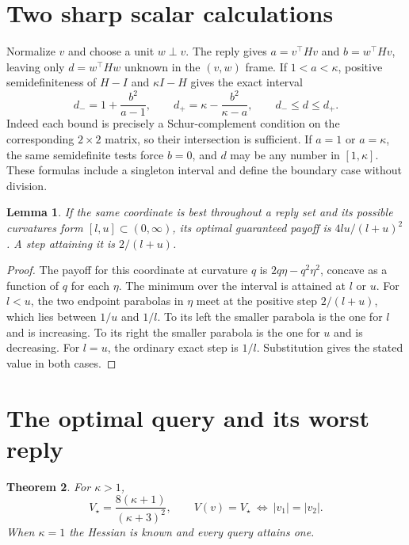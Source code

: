 \documentclass[11pt]{article}
\newtheorem{theorem}{Theorem}
\newtheorem{lemma}[theorem]{Lemma}
\begin{document}
\section{Two sharp scalar calculations}

Normalize \(v\) and choose a unit \(w\perp v\). The reply gives
\(a=v^\top Hv\) and \(b=w^\top Hv\), leaving only \(d=w^\top Hw\)
unknown in the \((v,w)\) frame. If \(1<a<\kappa\), positive
semidefiniteness of \(H-I\) and \(\kappa I-H\) gives the exact interval
\begin{equation}
 d_-=1+\frac{b^2}{a-1},\qquad
 d_+=\kappa-\frac{b^2}{\kappa-a},\qquad d_-\le d\le d_+.
 \label{eq:posterior}
\end{equation}
Indeed each bound is precisely a Schur-complement condition on the
corresponding \(2\times2\) matrix, so their intersection is sufficient.
If \(a=1\) or \(a=\kappa\), the same semidefinite tests force \(b=0\),
and \(d\) may be any number in \([1,\kappa]\). These formulas include
a singleton interval and define the boundary case without division.

\begin{lemma}\label{lem:scalar}
If the same coordinate is best throughout a reply set and its possible
curvatures form \([l,u]\subset(0,\infty)\), its optimal guaranteed
payoff is \(4lu/(l+u)^2\). A step attaining it is \(2/(l+u)\).
\end{lemma}
\begin{proof}
The payoff for this coordinate at curvature \(q\) is
\(2q\eta-q^2\eta^2\), concave as a function of \(q\) for each \(\eta\).
The minimum over the interval is attained at \(l\) or \(u\).
For \(l<u\), the two endpoint parabolas in \(\eta\) meet at the
positive step \(2/(l+u)\), which lies between \(1/u\) and \(1/l\).
To its left the smaller parabola is the one for \(l\) and is
increasing. To its right the smaller parabola is the one for \(u\)
and is decreasing. For \(l=u\), the ordinary exact step is \(1/l\).
Substitution gives the stated value in both cases.
\end{proof}

\section{The optimal query and its worst reply}

\begin{theorem}\label{thm:query}
For \(\kappa>1\),
\[
 V_\star=\frac{8(\kappa+1)}{(\kappa+3)^2},
 \qquad V(v)=V_\star\ \Longleftrightarrow\ |v_1|=|v_2|.
\]
When \(\kappa=1\) the Hessian is known and every query attains one.
\end{theorem}
\end{document}
